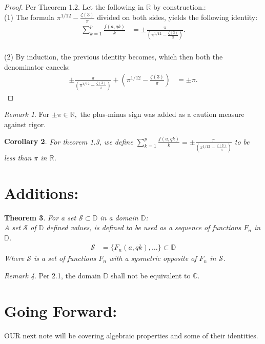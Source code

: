 \documentclass[10pt]{article}
\theoremstyle{plain}
\newtheorem{theorem}{Theorem}[section]
\newtheorem{corollary}[theorem]{Corollary}
\theoremstyle{definition}
\theoremstyle{remark}
\newtheorem{remark}[theorem]{Remark}
\begin{document}
\begin{proof}
Per Theorem 1.2. Let the following in $\mathbb{R}$ by construction.:\\(1) The formula $\pi^{1/12} - \frac{\zeta(3)}{\pi}$ divided on both sides, yields the following identity:
\begin{align*}
	\sum_{k=1}^{p} \frac{f(a, qk)}{k}  &= \pm \frac{\pi}{(\pi^{1/12} - \frac{\zeta(3)}{\pi})}.
\end{align*}\\
(2) By induction, the previous identity becomes, which then both the denominator cancels:
\begin{align*}
	\pm \frac{\pi}{(\pi^{1/12} - \frac{\zeta(3)}{\pi})} + (\pi^{1/12} - \frac{\zeta(3)}{\pi}) &= \pm \pi.
\end{align*}
\end{proof}
\begin{remark}
For $\pm \pi \in \mathbb{R},$ the plus-minus sign was added as a caution measure against rigor.
\end{remark}
\begin{corollary}
For theorem 1.3, we define $\sum_{k=1}^{p} \frac{f(a, qk)}{k} = \pm \frac{\pi}{(\pi^{1/12} - \frac{\zeta(3)}{\pi})}$ to be less than $\pi$ in $\mathbb{R}$.
\end{corollary}

\section{Additions:}

\begin{theorem}
	For a set $\mathcal{S} \subset \mathbb{D}$ in a domain $\mathbb{D}$:\\
	A set $\mathcal{S}$ of $\mathbb{D}$ defined values, is defined to be used as a sequence of functions $F_n$ in $\mathbb{D}$.
	\begin{align*}
		\mathcal{S} &= \{F_n(a, qk), \dots\} \subset \mathbb{D}
	\end{align*}
	Where $\mathcal{S}$ is a set of functions $F_n$ with a sysmetric opposite of $F_n$ in $\mathcal{S}$.
\end{theorem}

\begin{remark}
	Per 2.1, the domain $\mathbb{D}$ shall not be equivalent to $\mathbb{C}$.
\end{remark}

\section{Going Forward:}

\lettrine[lines=1, lhang=0.1, loversize=0.2]{O}UR next note will be covering algebraic properties and some of their identities.

\nocite{*}




\end{document}
